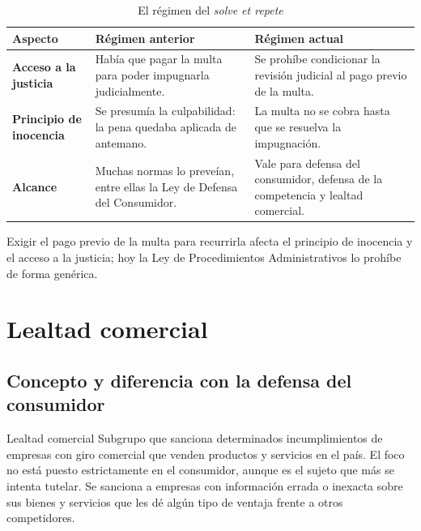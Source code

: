 \documentclass[12pt,oneside]{book}
\begin{document}
\begin{table}[H]
\centering
\caption{El régimen del \textit{solve et repete}}
\small
\begin{tabularx}{\textwidth}{
    >{\raggedright\arraybackslash}p{}
    >{\raggedright\arraybackslash}X
    >{\raggedright\arraybackslash}X
}
\toprule
\textbf{Aspecto} & \textbf{Régimen anterior} & \textbf{Régimen actual} \\
\midrule
\textbf{Acceso a la justicia} & Había que pagar la multa para poder impugnarla judicialmente. & Se prohíbe condicionar la revisión judicial al pago previo de la multa. \\
\textbf{Principio de inocencia} & Se presumía la culpabilidad: la pena quedaba aplicada de antemano. & La multa no se cobra hasta que se resuelva la impugnación. \\
\textbf{Alcance} & Muchas normas lo preveían, entre ellas la Ley de Defensa del Consumidor. & Vale para defensa del consumidor, defensa de la competencia y lealtad comercial. \\
\bottomrule
\end{tabularx}
\end{table}

\begin{important}
Exigir el pago previo de la multa para recurrirla afecta el principio de inocencia y el acceso a la justicia; hoy la Ley de Procedimientos Administrativos lo prohíbe de forma genérica.
\end{important}

\section{Lealtad comercial}

\subsection{Concepto y diferencia con la defensa del consumidor}

\begin{definition}{Lealtad comercial}
Subgrupo que sanciona determinados incumplimientos de empresas con giro comercial que venden productos y servicios en el país. El foco no está puesto estrictamente en el consumidor, aunque es el sujeto que más se intenta tutelar. Se sanciona a empresas con información errada o inexacta sobre sus bienes y servicios que les dé algún tipo de ventaja frente a otros competidores.
\end{definition}
\end{document}
